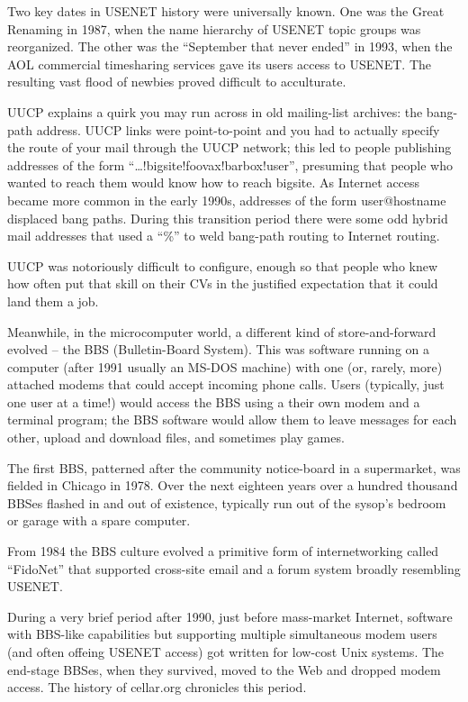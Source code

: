 \documentclass[10pt,twoside,openright]{memoir}
\begin{document}
Two key dates in USENET history were universally known. One was the Great Renaming in 1987, when the name hierarchy of USENET topic groups was reorganized. The other was the ``September that never ended'' in 1993, when the AOL commercial timesharing services gave its users access to USENET. The resulting vast flood of newbies proved difficult to acculturate.

UUCP explains a quirk you may run across in old mailing-list archives: the bang-path address. UUCP links were point-to-point and you had to actually specify the route of your mail through the UUCP network; this led to people publishing addresses of the form ``\dots!bigsite!foovax!barbox!user'', presuming that people who wanted to reach them would know how to reach bigsite. As Internet access became more common in the early 1990s, addresses of the form user@hostname displaced bang paths. During this transition period there were some odd hybrid mail addresses that used a ``\%'' to weld bang-path routing to Internet routing.

UUCP was notoriously difficult to configure, enough so that people who knew how often put that skill on their CVs in the justified expectation that it could land them a job.

Meanwhile, in the microcomputer world, a different kind of store-and-forward evolved -- the BBS (Bulletin-Board System). This was software running on a computer (after 1991 usually an MS-DOS machine) with one (or, rarely, more) attached modems that could accept incoming phone calls. Users (typically, just one user at a time!) would access the BBS using a their own modem and a terminal program; the BBS software would allow them to leave messages for each other, upload and download files, and sometimes play games.

The first BBS, patterned after the community notice-board in a supermarket, was fielded in Chicago in 1978. Over the next eighteen years over a hundred thousand BBSes flashed in and out of existence, typically run out of the sysop's bedroom or garage with a spare computer.

From 1984 the BBS culture evolved a primitive form of internetworking called ``FidoNet'' that supported cross-site email and a forum system broadly resembling USENET.

During a very brief period after 1990, just before mass-market Internet, software with BBS-like capabilities but supporting multiple simultaneous modem users (and often offeing USENET access) got written for low-cost Unix systems. The end-stage BBSes, when they survived, moved to the Web and dropped modem access. The history of cellar.org chronicles this period.
\end{document}
